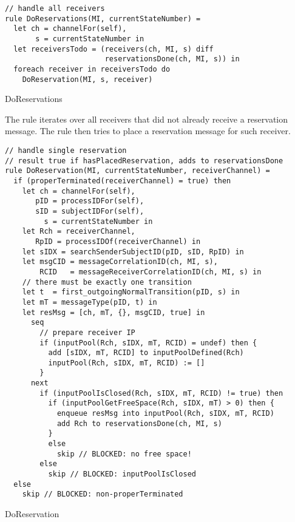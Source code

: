 \begin{listing}[htbp]
\begin{verbatim}
// handle all receivers
rule DoReservations(MI, currentStateNumber) =
  let ch = channelFor(self),
       s = currentStateNumber in
  let receiversTodo = (receivers(ch, MI, s) diff
                       reservationsDone(ch, MI, s)) in
  foreach receiver in receiversTodo do
    DoReservation(MI, s, receiver)
\end{verbatim}
\caption{DoReservations}
\label{lst:shortasm:DoReservations}
\end{listing}



The  rule iterates over all receivers that did not already receive a reservation message. The  rule then tries to place a reservation message for such receiver.

\begin{listing}[htbp]
\begin{verbatim}
// handle single reservation
// result true if hasPlacedReservation, adds to reservationsDone
rule DoReservation(MI, currentStateNumber, receiverChannel) =
  if (properTerminated(receiverChannel) = true) then
    let ch = channelFor(self),
       pID = processIDFor(self),
       sID = subjectIDFor(self),
         s = currentStateNumber in
    let Rch = receiverChannel,
       RpID = processIDOf(receiverChannel) in
    let sIDX = searchSenderSubjectID(pID, sID, RpID) in
    let msgCID = messageCorrelationID(ch, MI, s),
        RCID   = messageReceiverCorrelationID(ch, MI, s) in
    // there must be exactly one transition
    let t  = first_outgoingNormalTransition(pID, s) in
    let mT = messageType(pID, t) in
    let resMsg = [ch, mT, {}, msgCID, true] in
      seq
        // prepare receiver IP
        if (inputPool(Rch, sIDX, mT, RCID) = undef) then {
          add [sIDX, mT, RCID] to inputPoolDefined(Rch)
          inputPool(Rch, sIDX, mT, RCID) := []
        }
      next
        if (inputPoolIsClosed(Rch, sIDX, mT, RCID) != true) then
          if (inputPoolGetFreeSpace(Rch, sIDX, mT) > 0) then {
            enqueue resMsg into inputPool(Rch, sIDX, mT, RCID)
            add Rch to reservationsDone(ch, MI, s)
          }
          else
            skip // BLOCKED: no free space!
        else
          skip // BLOCKED: inputPoolIsClosed
  else
    skip // BLOCKED: non-properTerminated
\end{verbatim}
\caption{DoReservation}
\label{lst:shortasm:DoReservation}
\end{listing}


